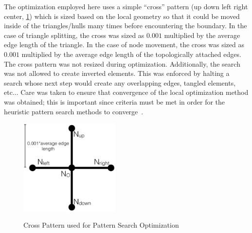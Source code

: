 The optimization employed here uses a simple ``cross'' pattern (up down
left right center, \ref{crossPattern}) which is sized based on the
local geometry so that it could be moved inside of the triangles/hulls
many times before encountering the boundary. In the case of triangle
splitting, the cross was sized as $0.001$ multiplied by the average edge
length of the triangle. In the case of node movement, the cross was
sized as $0.001$ multiplied by the average edge length of the
topologically attached edges. The cross pattern was not resized during
optimization.  Additionally, the search was not allowed to create
inverted elements.  This was enforced by halting a search whose next
step would create any overlapping edges, tangled elements, etc... Care
was taken to ensure that convergence of the local optimization method
was obtained; this is important since criteria must be met in order for
the heuristic pattern search methods to
converge~\cite{patternsearch2,patternsearch3}.

\begin{figure}
  \begin{center}
  \label{crossPattern}
  \includegraphics[width=50mm]{Figures/crossPattern.png}
  \caption{Cross Pattern used for Pattern Search Optimization}
  \end{center}
\end{figure}
